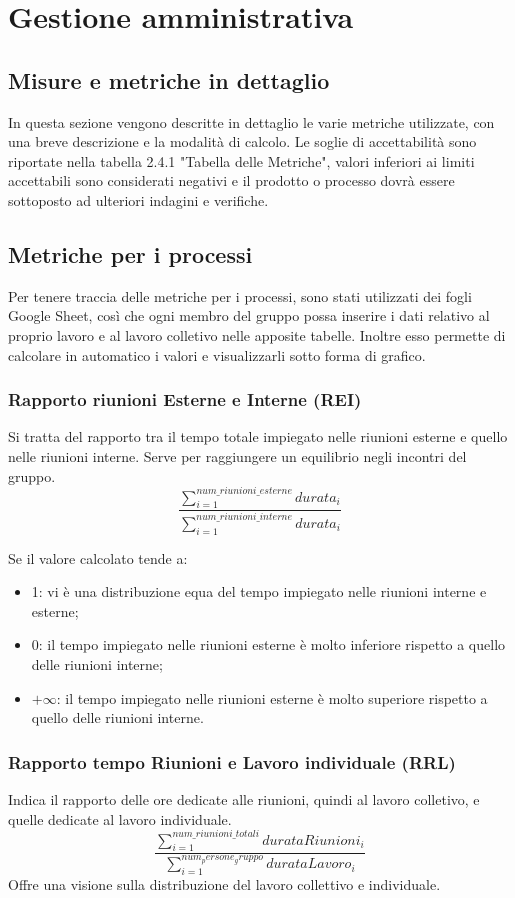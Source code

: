 \section{Gestione amministrativa}
\subsection{Misure e metriche in dettaglio}
In questa sezione vengono descritte in dettaglio le varie metriche utilizzate, con una breve descrizione e la modalità di calcolo. 
Le soglie di accettabilità sono riportate nella tabella 2.4.1 "Tabella delle Metriche", valori inferiori ai limiti accettabili sono considerati negativi e il prodotto o processo dovrà essere sottoposto ad ulteriori indagini e verifiche.
\subsection{Metriche per i processi}
Per tenere traccia delle metriche per i processi, sono stati utilizzati dei fogli Google Sheet, così che ogni membro del gruppo possa inserire i dati relativo al proprio lavoro e al lavoro colletivo nelle apposite tabelle. Inoltre esso permette di calcolare in automatico i valori e visualizzarli sotto forma di grafico. 

\subsubsection{Rapporto riunioni Esterne e Interne (REI)}
Si tratta del rapporto tra il tempo totale impiegato nelle riunioni esterne e quello nelle riunioni interne. Serve per raggiungere un equilibrio negli incontri del gruppo.
\[\frac{\sum_{i=1}^{num\_riunioni\_esterne} durata_i}{\sum_{i=1}^{num\_riunioni\_interne} durata_i}\]

Se il valore calcolato tende a:
\begin{itemize}
    \item 1: vi è una distribuzione equa del tempo impiegato nelle riunioni interne e esterne;
    \item 0: il tempo impiegato nelle riunioni esterne è molto inferiore rispetto a quello delle riunioni interne;
    \item $+\infty$: il tempo impiegato nelle riunioni esterne è molto superiore rispetto a quello delle riunioni interne.
\end{itemize}
\subsubsection{Rapporto tempo Riunioni e Lavoro individuale (RRL)}
Indica il rapporto delle ore dedicate alle riunioni, quindi al lavoro colletivo, e quelle dedicate al lavoro individuale. 
\[\dfrac{\sum_{i=1}^{num\_riunioni\_totali} durataRiunioni_i}{\sum_{i=1}^{num_persone_gruppo} durataLavoro_i}\]
Offre una visione sulla distribuzione del lavoro collettivo e individuale.
